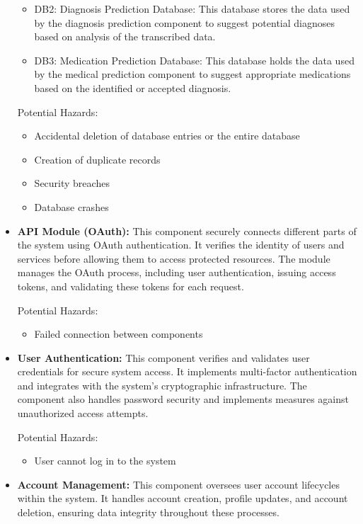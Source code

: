 \documentclass{article}
\begin{document}
\begin{itemize}
\begin{itemize}
        \item DB2: Diagnosis Prediction Database: This database stores the data used by the diagnosis prediction component to suggest potential diagnoses based on analysis of the transcribed data.

        \item DB3: Medication Prediction Database: This database holds the data used by the medical prediction component to suggest appropriate medications based on the identified or accepted diagnosis.
    \end{itemize}

    Potential Hazards:
    \begin{itemize}
        \item Accidental deletion of database entries or the entire database
        \item Creation of duplicate records
        \item Security breaches
        \item Database crashes   
    \end{itemize}
    
    \item \textbf{API Module (OAuth):}
    This component securely connects different parts of the system using OAuth authentication. It verifies the identity of users and services before allowing them to access protected resources. The module manages the OAuth process, including user authentication, issuing access tokens, and validating these tokens for each request.
    
    Potential Hazards:
    \begin{itemize}
        \item Failed connection between components
    \end{itemize}
    
    \item \textbf{User Authentication:}
    This component verifies and validates user credentials for secure system access. It implements multi-factor authentication and integrates with the system's cryptographic infrastructure. The component also handles password security and implements measures against unauthorized access attempts.
    
    Potential Hazards:
    \begin{itemize}
        \item User cannot log in to the system
    \end{itemize}
    
    \item \textbf{Account Management:}
    This component oversees user account lifecycles within the system. It handles account creation, profile updates, and account deletion, ensuring data integrity throughout these processes.
    

\end{itemize}
\end{document}
